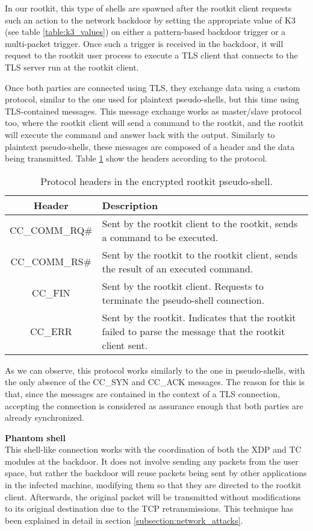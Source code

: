 In our rootkit, this type of shells are spawned after the rootkit client requests such an action to the network backdoor by setting the appropriate value of K3 (see table \ref{table:k3_values}) on either a pattern-based backdoor trigger or a multi-packet trigger. Once such a trigger is received in the backdoor, it will request to the rootkit user process to execute a TLS client that connects to the TLS server run at the rootkit client. 

Once both parties are connected using TLS, they exchange data using a custom protocol, similar to the one used for plaintext pseudo-shells, but this time using TLS-contained messages. This message exchange works as master/slave protocol too, where the rootkit client will send a command to the rootkit, and the rootkit will execute the command and answer back with the output. Similarly to plaintext pseudo-shells, these messages are composed of a header and the data being transmitted. Table \ref{table:eps_headers} show the headers according to the protocol.

\begin{table}[htbp]
\begin{tabular}{|c|>{\centering\arraybackslash}p{8cm}|}
\hline
\textbf{Header} & \textbf{Description}\\
\hline
\hline
CC\_COMM\_RQ\# & Sent by the rootkit client to the rootkit, sends a command to be executed.\\
\hline
CC\_COMM\_RS\# & Sent by the rootkit to the rootkit client, sends the result of an executed command.\\
\hline
CC\_FIN & Sent by the rootkit client. Requests to terminate the pseudo-shell connection.\\
\hline
CC\_ERR & Sent by the rootkit. Indicates that the rootkit failed to parse the message that the rootkit client sent.\\
\hline
\end{tabular}
\caption{Protocol headers in the encrypted rootkit pseudo-shell.}
\label{table:eps_headers}
\end{table}

As we can observe, this protocol works similarly to the one in pseudo-shells, with the only absence of the CC\_SYN and CC\_ACK messages. The reason for this is that, since the messages are contained in the context of a TLS connection, accepting the connection is considered as assurance enough that both parties are already synchronized.



\textbf{Phantom shell}\\
This shell-like connection works with the coordination of both the XDP and TC modules at the backdoor. It does not involve sending any packets from the user space, but rather the backdoor will reuse packets being sent by other applications in the infected machine, modifying them so that they are directed to the rootkit client. Afterwards, the original packet will be transmitted without modifications to its original destination due to the TCP retransmissions. This technique has been explained in detail in section \ref{subsection:network_attacks}.

